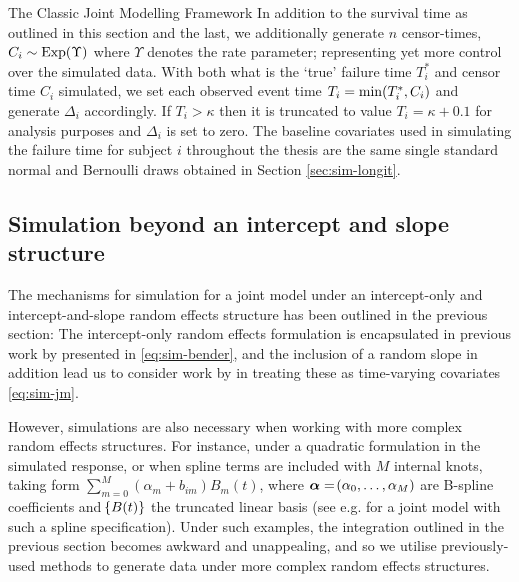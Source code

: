 \begin{chapter}{\label{cha:methods-classic}The Classic Joint Modelling Framework}
  In addition to the survival time as outlined in this section and the last, we additionally generate $n$ censor-times, $C_i\sim\mathrm{Exp}\!\left( \Upsilon\right)$ where $\Upsilon$ denotes the rate parameter; representing yet more control over the simulated data. With both what is the `true' failure time $T_i^*$ and censor time $C_i$ simulated, we set each observed event time $T_i=\min\!\left( T_i^*,C_i\right)$ and generate $\Delta_i$ accordingly. If $T_i>\kappa$ then it is truncated to value $T_i=\kappa+0.1$ for analysis purposes and $\Delta_i$ is set to zero. The baseline covariates used in simulating the failure time for subject $i$ throughout the thesis are the same single standard normal and Bernoulli draws obtained in Section \ref{sec:sim-longit}. 
  
  \subsection{Simulation beyond an intercept and slope structure\label{sec:sim-quad}}
  The mechanisms for simulation for a joint model under an intercept-only and intercept-and-slope random effects structure has been outlined in the previous section: The intercept-only random effects formulation is encapsulated in previous work by \citet{Bender2005} presented in \eqref{eq:sim-bender}, and the inclusion of a random slope in addition lead us to consider work by \citet{Austin2012} in treating these as time-varying covariates \eqref{eq:sim-jm}.
  
  However, simulations are also necessary when working with more complex random effects structures. For instance, under a quadratic formulation in the simulated response, or when spline terms are included with $M$ internal knots, taking form $\sum_{m=0}^M(\alpha_m+b_{im})B_m(t)$, where $\bm{\alpha}=\!\left(\alpha_0,\dots,\alpha_M\right)$ are B-spline coefficients and $\!\left\{ B(t)\right\}$ the truncated linear basis (see e.g. \citet{Barrett2017} for a joint model with such a spline specification). Under such examples, the integration outlined in the previous section becomes awkward and unappealing, and so we utilise previously-used methods \citep{R-joineR} to generate data under more complex random effects structures.
  

\end{chapter}
